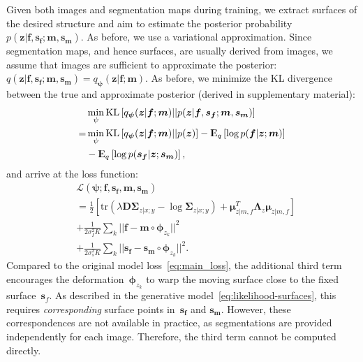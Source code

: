 \documentclass{article}
\newcommand{\bD}{\boldsymbol{D}}
\newcommand{\bs}{\boldsymbol{s}}
\newcommand{\bmu}{\boldsymbol{\mu}}
\newcommand{\bphi}{\boldsymbol{\phi}}
\newcommand{\bpsi}{\boldsymbol{\psi}}
\newcommand{\bSigma}{\boldsymbol{\Sigma}}
\newcommand{\bLambda}{\boldsymbol{\Lambda}}
\newcommand{\KL}{\text{KL}}
\newcommand{\bz}{\boldsymbol{z}}
\newcommand{\bmoving}{\boldsymbol{m}}
\newcommand{\bfixed}{\boldsymbol{f}}
\newcommand{\moving}{m}
\newcommand{\fixed}{f}
\newcommand{\Expect}{{\rm I\kern-.3em E}}
\begin{document}
Given both images and segmentation maps during training, we extract surfaces of the desired structure and aim to estimate the posterior probability~$p(\bz|\bfixed, \bs_{\bfixed}; \bmoving, \bs_{\bmoving})$. As before, we use a variational approximation. Since segmentation maps, and hence surfaces, are usually derived from images, we assume that images are sufficient to approximate the posterior:~\mbox{$q(\bz|\bfixed, \bs_{\bfixed}; \bmoving, \bs_{\bmoving}) = q_{\bpsi}(\bz|\bfixed; \bmoving)$}. As before, we minimize the KL divergence between the true and approximate posterior (derived in supplementary material):
\begin{align}
&\min_{\psi} \KL \left[q_{\bpsi}(\bz|\bfixed ; \bmoving) || p(\bz|\bfixed, \bs_{\bfixed}; \bmoving, \bs_{\bmoving}) \right] \nonumber \\
=&\min_{\psi} \KL \left[  q_{\bpsi}(\bz|\bfixed; \bmoving) ||  p(\bz)  \right] 
- \Expect_{q} \left[ \log p(\bfixed | \bz ; \bmoving) \right] \nonumber \\
&-  \Expect_{q} \left[ \log p(\bs_{\bfixed} | \bz ; \bs_{\bmoving}) \right],
\end{align}
and arrive at the loss function:
\begin{align}
&\mathcal{L}(\bpsi; \bfixed, \bs_{\bfixed}, \bmoving, \bs_{\bmoving})  \nonumber \\
&= \frac{1}{2} \left[ \text{tr}(\lambda\bD \bSigma_{z|x;y} - \log\bSigma_{z|x;y}) + \bmu_{z | \moving, \fixed}^T \bLambda_z \bmu_{z | \moving, \fixed} \right] \nonumber \\
&+ \frac{1}{2\sigma_I^2K} \sum_k ||\bfixed - \bmoving \circ \bphi_{z_k}||^2  \nonumber \\
&+ \frac{1}{2\sigma_s^2K} \sum_k ||\bs_{\bfixed} - \bs_{\bmoving} \circ \bphi_{z_k}||^2.
\label{eq:surf-loss}
\end{align}
Compared to the original model loss~\eqref{eq:main_loss}, the additional third term encourages the deformation~$\bphi_{z_k}$ to warp the moving surface close to the fixed surface~$\bs_f$. As described in the generative model~\eqref{eq:likelihood-surfaces}, this requires \textit{corresponding} surface points in~$\bs_{\bfixed}$ and $\bs_{\bmoving}$. However, these correspondences are not available in practice, as segmentations are provided independently for each image. Therefore, the third term cannot be computed directly.
\end{document}
